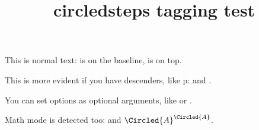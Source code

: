 \documentclass{article}
\title{circledsteps tagging test}
\begin{document}
This is normal text:  is on the
baseline,  is on top.

This is more evident if you have descenders,
like p:  and .

You can set options as optional arguments,
like  or
.

Math mode is detected too: 
and $\Circled{A}^{\Circled{A}}$.
\end{document}
